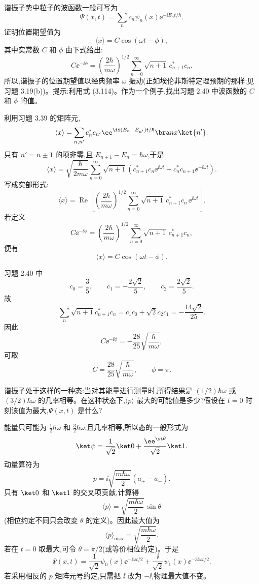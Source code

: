\begin{question}
谐振子势中粒子的波函数一般可写为
\[
\Psi(x,t)=\sum_n c_n\psi_n(x)\mathrm \ee^{-\ii E_nt/\hbar}.
\]
证明位置期望值为
\[
\langle x\rangle=C\cos(\omega t-\phi),
\]
其中实常数 $C$ 和 $\phi$ 由下式给出:
\[
C\ee^{-\ii\phi}=\left(\frac{2\hbar}{m\omega}\right)^{1/2}
\sum_{n=0}^{\infty}\sqrt{n+1}\,c_{n+1}^*c_n.
\]
所以,谐振子的位置期望值以经典频率 $\omega$ 振动(正如埃伦菲斯特定理预期的那样;见习题 3.19(b))。提示:利用式 (3.114)。作为一个例子,找出习题 2.40 中波函数的 $C$ 和 $\phi$ 的值。

\par\smallskip
{}

\end{question}
\begin{solution}
利用习题 3.39 的矩阵元,
\[
\langle x\rangle
=\sum_{n,n'}c_n^*c_{n'}\ee^{\ii(E_n-E_{n'})t/\hbar}\bra n x\ket{n'}.
\]
只有 $n'=n\pm1$ 的项非零,且 $E_{n+1}-E_n=\hbar\omega$,于是
\[
\langle x\rangle=\sqrt{\frac{\hbar}{2m\omega}}
\sum_{n=0}^{\infty}\sqrt{n+1}
\left(c_{n+1}^*c_n\ee^{\ii\omega t}+c_n^*c_{n+1}\ee^{-\ii\omega t}\right).
\]
写成实部形式:
\[
\langle x\rangle=\operatorname{Re}\left[
\left(\frac{2\hbar}{m\omega}\right)^{1/2}
\sum_{n=0}^{\infty}\sqrt{n+1}\,c_{n+1}^*c_n\,\ee^{\ii\omega t}\right].
\]
若定义
\[
C\ee^{-\ii\phi}=\left(\frac{2\hbar}{m\omega}\right)^{1/2}
\sum_{n=0}^{\infty}\sqrt{n+1}\,c_{n+1}^*c_n,
\]
便有
\[
\boxed{\langle x\rangle=C\cos(\omega t-\phi).}
\]

习题 2.40 中
\[
c_0=\frac35,
\qquad c_1=-\frac{2\sqrt2}{5},
\qquad c_2=\frac{2\sqrt2}{5}.
\]
故
\[
\sum_n\sqrt{n+1}c_{n+1}^*c_n
=c_1c_0+\sqrt2c_2c_1
=-\frac{14\sqrt2}{25}.
\]
因此
\[
C\ee^{-\ii\phi}=-\frac{28}{25}\sqrt{\frac{\hbar}{m\omega}},
\]
可取
\[
\boxed{C=\frac{28}{25}\sqrt{\frac{\hbar}{m\omega}},\qquad \phi=\pi.}
\]
\end{solution}

\begin{question}
谐振子处于这样的一种态:当对其能量进行测量时,所得结果是 $(1/2)\hbar\omega$ 或 $(3/2)\hbar\omega$ 的几率相等。在这种状态下,$\langle p\rangle$ 最大的可能值是多少?假设在 $t=0$ 时刻该值为最大,$\Psi(x,t)$ 是什么?
\end{question}
\begin{solution}
能量只可能为 $\frac12\hbar\omega$ 和 $\frac32\hbar\omega$,且几率相等,所以态的一般形式为
\[
\ket\psi=\frac1{\sqrt2}\ket0+\frac{\ee^{\ii\theta}}{\sqrt2}\ket1.
\]
动量算符为
\[
p=\ii\sqrt{\frac{m\hbar\omega}{2}}(a_+-a_-).
\]
只有 $\ket0$ 和 $\ket1$ 的交叉项贡献,计算得
\[
\langle p\rangle
=\sqrt{\frac{m\hbar\omega}{2}}\,\sin\theta
\]
(相位约定不同只会改变 $\theta$ 的定义)。因此最大值为
\[
\boxed{\langle p\rangle_{\max}=\sqrt{\frac{m\hbar\omega}{2}}.}
\]
若在 $t=0$ 取最大,可令 $\theta=\pi/2$(或等价相位约定)。于是
\[
\boxed{\Psi(x,t)=\frac1{\sqrt2}\psi_0(x)\ee^{-\ii\omega t/2}
+\frac{\ii}{\sqrt2}\psi_1(x)\ee^{-3\ii\omega t/2}.}
\]
若采用相反的 $p$ 矩阵元号约定,只需把 $\ii$ 改为 $-\ii$,物理最大值不变。
\end{solution}

